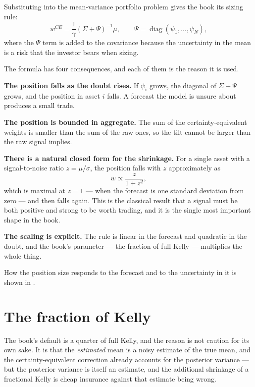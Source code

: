 Substituting into the mean-variance portfolio problem gives the book its
sizing rule:
\begin{equation}
w^{CE} = \frac{1}{\gamma}\left(\Sigma + \Psi\right)^{-1}\mu,
\qquad
\Psi = \operatorname{diag}(\psi_1,\dots,\psi_N),
\end{equation}
where the \(\Psi\) term is added to the covariance because the
uncertainty in the mean is a risk that the investor bears when sizing.

The formula has four consequences, and each of them is the reason it is
used.

\textbf{The position falls as the doubt rises.} If \(\psi_i\) grows, the
diagonal of \(\Sigma+\Psi\) grows, and the position in asset \(i\) falls.
A forecast the model is unsure about produces a small trade.

\textbf{The position is bounded in aggregate.} The sum of the
certainty-equivalent weights is smaller than the sum of the raw ones, so
the tilt cannot be larger than the raw signal implies.

\textbf{There is a natural closed form for the shrinkage.} For a single
asset with a signal-to-noise ratio \(z = \mu/\sigma\), the position falls
with \(z\) approximately as
\begin{equation}
w \propto \frac{z}{1 + z^{2}},
\end{equation}
which is maximal at \(z = 1\) --- when the forecast is one standard
deviation from zero --- and then falls again. This is the classical
result that a signal must be both positive and strong to be worth
trading, and it is the single most important shape in the book.

\textbf{The scaling is explicit.} The rule is linear in the forecast and
quadratic in the doubt, and the book's parameter --- the fraction of full
Kelly --- multiplies the whole thing.

How the position size responds to the forecast and to the uncertainty in it is shown in .

\section{The fraction of Kelly}

The book's default is a quarter of full Kelly, and the reason is not
caution for its own sake. It is that the \emph{estimated} mean is a noisy
estimate of the true mean, and the certainty-equivalent correction
already accounts for the posterior variance --- but the posterior variance
is itself an estimate, and the additional shrinkage of a fractional Kelly
is cheap insurance against that estimate being wrong.

